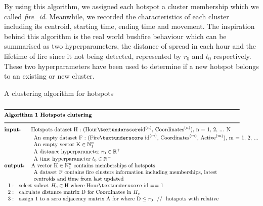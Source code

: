 \documentclass{monashthesis}
\begin{document}
By using this algorithm, we assigned each hotspot a cluster membership which we called \emph{fire\_id}. Meanwhile, we recorded the characteristics of each cluster including its centroid, starting time, ending time and movement. The inspiration behind this algorithm is the real world bushfire behaviour which can be summarised as two hyperparameters, the distance of spread in each hour and the lifetime of fire since it not being detected, represented by \(r_0\) and \(t_0\) respectively. These two hyperparameters have been used to determine if a new hotspot belongs to an existing or new cluster.

\normalfont
\begin{table}
\caption{\label{tab:clustering}A clustering algorithm for hotspots}
\begin{align*}
&\rule{150mm}{0.5mm}\\[-1\jot]
&\textbf{Algorithm 1 Hotspots clutering}\\[-1\jot]
&\rule{150mm}{0.5mm}\\[-1\jot]
&\textbf{input: }~~~~\text{Hotspots dataset H : (Hour}\textunderscore \text{id}^{(n)} \text{, Coordinates}^{(n)} \text{), n = 1, 2, ... N}\\[-1\jot]
&~~~~~~~~~~~~~~~~\text{An empty dataset F : (Fire\textunderscore id}^{(m)} \text{, Coordinates}^{(m)} \text{, Active}^{(m)} \text{), m = 1, 2, ...}\\[-1\jot]
&~~~~~~~~~~~~~~~~\text{An empty vector K} \in \mathbb{N}_1^n\\[-1\jot]
&~~~~~~~~~~~~~~~~\text{A distance hyperparameter }r_0 \in \mathbb{R}^+\\[-1\jot]
&~~~~~~~~~~~~~~~~\text{A time hyperparameter }t_0 \in \mathbb{N}^+\\[-1\jot]
&\textbf{output: }~~\text{A vector K} \in \mathbb{N}_1^n~\text{contains memberships of hotspots}\\[-1\jot]
&~~~~~~~~~~~~~~~~\text{A dataset F contains fire clusters information including memberships, latest}\\[-1\jot]
&~~~~~~~~~~~~~~~~\text{centroids and time from last updated}\\[-1\jot]
&~~1:~~\text{select subset }H_c \in \text{H where Hour\textunderscore id == 1}\\[-1\jot]
&~~2:~~\text{calculate distance matrix D for Coordinates in }H_c \\[-1\jot]
&~~3:~~\text{assign 1 to a zero adjacency matrix A for where D} \leq r_0~~//~~\text{hotspots with relative}\\[-1\jot]

\end{align*}
\end{table}
\end{document}
